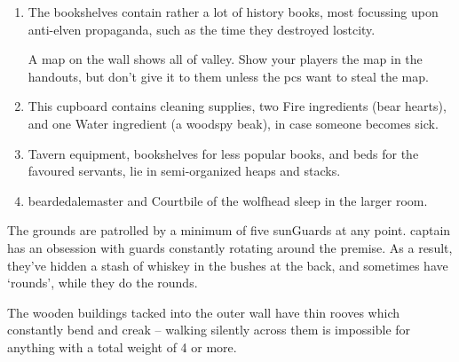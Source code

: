 \begin{multicols}{2}
\begin{enumerate}
  \item
  \label{horseUpstairs}
  The bookshelves contain rather a lot of history books, most focussing upon anti-elven propaganda, such as the time they destroyed \gls{lostcity}.

  A map on the wall shows all of \gls{valley}.
  Show your players the map in the handouts, but don't give it to them unless the \glspl{pc} want to steal the map.
  \item
  \label{horseCupboard}
  This cupboard contains cleaning supplies, two Fire \glspl{ingredient} (bear hearts), and one Water \gls{ingredient} (a woodspy beak), in case someone becomes sick.
  \item
  \label{horseSideRoom}
  Tavern equipment, bookshelves for less popular books, and beds for the favoured servants, lie in semi-organized heaps and stacks.
  \item
  \label{wolfRoom}
  \Gls{beardedalemaster} and Courtbile of the \gls{wolfhead} sleep in the larger room.%
\end{enumerate}



The grounds are patrolled by a minimum of five \glspl{sunGuard} at any point.
\Gls{captain} has an obsession with guards constantly rotating around the premise.
As a result, they've hidden a stash of whiskey in the bushes at the back, and sometimes have `rounds', while they do the rounds.

The wooden buildings tacked into the outer wall have thin rooves which constantly bend and creak -- walking silently across them is impossible for anything with a total weight of 4 or more.





\end{multicols}
